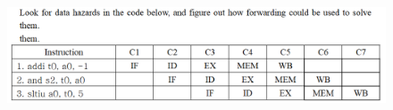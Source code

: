 \documentclass[cn,12pt]{homework}
\begin{document}
\begin{problem}
  \quad
  \begin{figure}[H]
    \centering
    \includegraphics[width=1\textwidth]{./figures/image2.png}
    \label{fig:pro1}
  \end{figure}



\end{problem}
\end{document}
